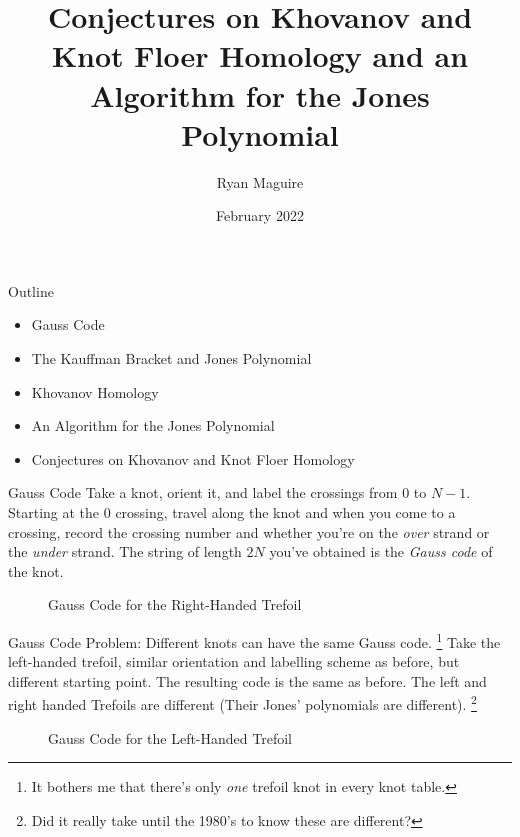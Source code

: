 \documentclass{beamer}
\title{Conjectures on Khovanov and Knot Floer Homology and an Algorithm
       for the Jones Polynomial}
\author{Ryan Maguire}
\date{February 2022}
\begin{document}
    \maketitle
    \begin{frame}{Outline}
        \begin{itemize}
            \item Gauss Code
            \item The Kauffman Bracket and Jones Polynomial
            \item Khovanov Homology
            \item An Algorithm for the Jones Polynomial
            \item Conjectures on Khovanov and Knot Floer Homology
        \end{itemize}
    \end{frame}
    \begin{frame}{Gauss Code}
        Take a knot, orient it, and label the crossings from 0 to $N-1$.
        Starting at the 0 crossing, travel along the knot and when you come
        to a crossing, record the crossing number and whether you're on the
        \textit{over} strand or the \textit{under} strand. The string of length
        $2N$ you've obtained is the \textit{Gauss code} of the knot.
        \begin{figure}
            \centering
            \caption{Gauss Code for the Right-Handed Trefoil}
            \label{fig:right_handed_trefoil_gauss_code}
        \end{figure}
    \end{frame}
    \begin{frame}{Gauss Code}
        Problem: Different knots can have the same Gauss code.%
        \footnote{%
            It bothers me that there's only \textit{one} trefoil knot in every
            knot table.
        }
        Take the left-handed trefoil, similar orientation and labelling scheme
        as before, but different starting point. The resulting code is the same
        as before. The left and right handed Trefoils are different
        (Their Jones' polynomials are different).%
        \footnote{
            Did it really take until the 1980's to know these are different?
        }
        \begin{figure}
            \centering
            \caption{Gauss Code for the Left-Handed Trefoil}
            \label{fig:left_handed_trefoil_gauss_code}
        \end{figure}
    \end{frame}
\end{document}
